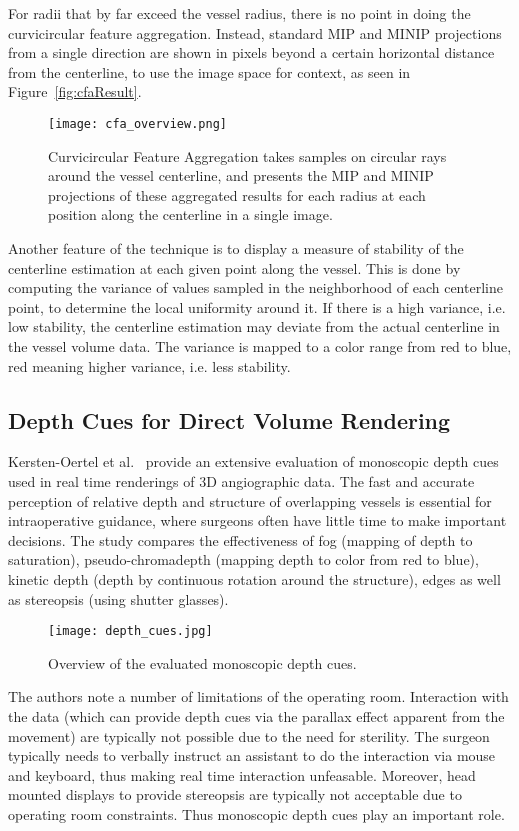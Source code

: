 For radii that by far exceed the vessel radius, there is no point in doing the curvicircular feature aggregation. Instead, standard MIP and MINIP projections from a single direction are shown in pixels beyond a certain horizontal distance from the centerline, to use the image space for context, as seen in Figure~\ref{fig:cfaResult}.
\begin{figure*}[htb]
  \centering
  \texttt{[image: cfa\_overview.png]}
  \caption{\label{fig:cfaOverview} Curvicircular Feature Aggregation takes samples on circular rays around the vessel centerline, and presents the MIP and MINIP projections of these aggregated results for each radius at each position along the centerline in a single image.}
  \cite{mistelbauer2013vessel}
\end{figure*}
Another feature of the technique is to display a measure of stability of the centerline estimation at each given point along the vessel. This is done by computing the variance of values sampled in the neighborhood of each centerline point, to determine the local uniformity around it. If there is a high variance, i.e. low stability, the centerline estimation may deviate from the actual centerline in the vessel volume data. The variance is mapped to a color range from red to blue, red meaning higher variance, i.e. less stability.


\subsection*{Depth Cues for Direct Volume Rendering}

Kersten-Oertel et al.~\cite{kersten2014evaluation} provide an extensive evaluation of monoscopic depth cues used in real time renderings of 3D angiographic data. The fast and accurate perception of relative depth and structure of overlapping vessels is essential for intraoperative guidance, where surgeons often have little time to make important decisions. The study compares the effectiveness of fog (mapping of depth to saturation), pseudo-chromadepth (mapping depth to color from red to blue), kinetic depth (depth by continuous rotation around the structure), edges as well as stereopsis (using shutter glasses). 
\begin{figure}[htb]
  \centering
  \texttt{[image: depth\_cues.jpg]}
  \caption{\label{fig:depthCues} Overview of the evaluated monoscopic depth cues.}
  \cite{mistelbauer2013vessel}
\end{figure}
The authors note a number of limitations of the operating room. Interaction with the data (which can provide depth cues via the parallax effect apparent from the movement) are typically not possible due to the need for sterility. The surgeon typically needs to verbally instruct an assistant to do the interaction via mouse and keyboard, thus making real time interaction unfeasable. Moreover, head mounted displays to provide stereopsis are typically not acceptable due to operating room constraints. Thus monoscopic depth cues play an important role.

